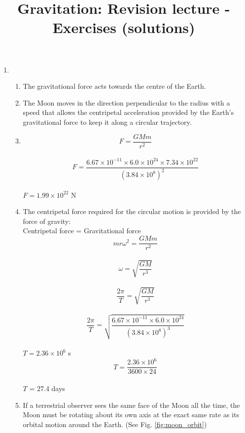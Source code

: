 \documentclass[a4paper,12pt]{article}
\title{Gravitation: Revision lecture - Exercises (solutions)}
\date{}
\begin{document}
\maketitle

\begin{enumerate} %
\item 

\begin{enumerate}
\item The gravitational force acts towards the centre of the Earth.
\item The Moon moves in the direction perpendicular to the radius with a speed that allows the centripetal acceleration provided by the Earth's gravitational force to keep it along a circular trajectory.  
\item \[F=\frac{GMm}{r^2}\]\\
\[F=\frac{6.67\times 10^{-11}\times 6.0 \times 10^{24} \times 7.34 \times 10^{22}}{(3.84 \times 10^8)^2}\]\\
$F = 1.99 \times 10^{22}$ N\\
\item The centripetal force required for the circular motion is provided by the force of gravity:\\
Centripetal force = Gravitational force\\
\[mr\omega^2= \frac{GMm}{r^2} \]\\ 
\[\omega= \sqrt{ \frac{GM}{r^3}} \]\\ 
\[ \frac{2\pi}{T}= \sqrt{ \frac{GM}{r^3}} \]\\ 
\[ \frac{2\pi}{T}= \sqrt{ \frac{6.67\times 10^{-11}\times 6.0 \times 10^{24}}{(3.84 \times 10^8)^3}} \]\\ 
$T = 2.36 \times 10^6 $ s\\ 
\[ T = \frac{2.36 \times 10^6}{3600 \times 24} \]  \\
$T$ = 27.4 days\\


\item If a terrestrial observer sees the same face of the Moon all the time, the Moon must be rotating about its own axis at the exact same rate as its orbital motion around the Earth. (See Fig. \ref{fig:moon_orbit})\\ 

\begin{figure}[h]
\centering
{}
\end{figure}
\end{enumerate}
\end{enumerate}
\end{document}
